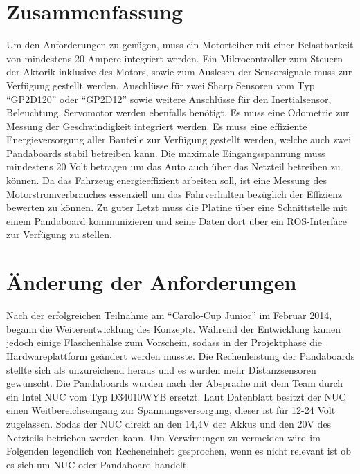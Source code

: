 \section{Zusammenfassung}
Um den Anforderungen zu genügen, muss ein Motorteiber mit einer Belastbarkeit von mindestens 20 Ampere integriert werden. 
Ein Mikrocontroller zum Steuern der Aktorik inklusive des Motors, sowie zum Auslesen der Sensorsignale muss zur Verfügung gestellt werden. 
Anschlüsse für zwei Sharp Sensoren vom Typ ``GP2D120'' oder ``GP2D12'' sowie weitere Anschlüsse für den Inertialsensor, Beleuchtung, Servomotor werden ebenfalls benötigt. 
Es muss eine Odometrie zur Messung der Geschwindigkeit integriert werden.
Es muss eine effiziente Energieversorgung aller Bauteile zur Verfügung gestellt werden, welche auch zwei Pandaboards stabil betreiben kann. Die maximale Eingangsspannung
muss mindestens 20 Volt betragen um das Auto auch über das Netzteil betreiben zu können.
Da das Fahrzeug energieeffizient arbeiten soll, ist eine Messung des Motorstromverbrauches essenziell um das Fahrverhalten bezüglich der Effizienz bewerten zu können.
Zu guter Letzt muss die Platine über eine Schnittstelle mit einem Pandaboard kommunizieren und seine Daten dort über ein ROS-Interface zur Verfügung zu stellen.

\section{Änderung der Anforderungen}
Nach der erfolgreichen Teilnahme am ``Carolo-Cup Junior'' im Februar 2014, begann die Weiterentwicklung des Konzepts. Während der Entwicklung kamen jedoch
einige Flaschenhälse zum Vorschein, sodass in der Projektphase die Hardwareplattform geändert werden musste. Die Rechenleistung der Pandaboards stellte sich
als unzureichend heraus und es wurden mehr Distanzsensoren gewünscht. Die Pandaboards wurden nach der Absprache mit dem Team durch ein Intel NUC vom Typ
D34010WYB ersetzt. Laut Datenblatt \cite{datasheet-nuc} besitzt der NUC einen Weitbereichseingang zur Spannungsversorgung, dieser ist für 12-24 Volt zugelassen.
Sodas der NUC direkt an den 14,4V der Akkus und den 20V des Netzteils betrieben werden kann. Um Verwirrungen zu vermeiden wird im Folgenden legendlich 
von Recheneinheit gesprochen, wenn es nicht relevant ist ob es sich um NUC oder Pandaboard handelt.
